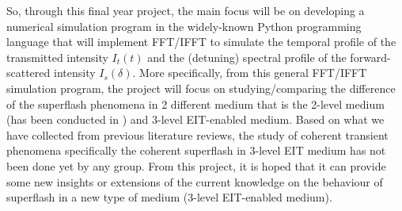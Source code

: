 So, through this final year project, the main focus will be on developing a numerical simulation program in the widely-known Python programming language that will implement FFT/IFFT to simulate the temporal profile of the transmitted intensity $I_{t}(t)$ and the (detuning) spectral profile of the forward-scattered intensity $I_{s}(\delta)$. More specifically, from this general FFT/IFFT simulation program, the project will focus on studying/comparing the difference of the superflash phenomena in 2 different medium that is the 2-level medium (has been conducted in \cite{}) and 3-level EIT-enabled medium. Based on what we have collected from previous literature reviews, the study of coherent transient phenomena specifically the coherent superflash in 3-level EIT medium has not been done yet by any group. From this project, it is hoped that it can provide some new insights or extensions of the current knowledge on the behaviour of superflash in a new type of medium (3-level EIT-enabled medium).
